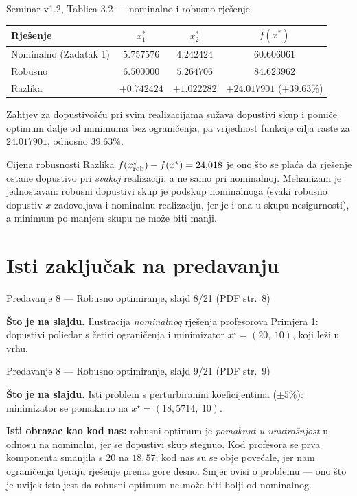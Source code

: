 \begin{seminar}{Seminar v1.2, Tablica 3.2 --- nominalno i robusno rješenje}
\begin{center}
\begin{tabular}{lccc}
\toprule
\textbf{Rješenje} & $x_1^*$ & $x_2^*$ & $f(x^*)$ \\
\midrule
Nominalno (Zadatak 1) & $5.757576$ & $4.242424$ & $60.606061$ \\
Robusno               & $6.500000$ & $5.264706$ & $84.623962$ \\
\midrule
Razlika               & $+0.742424$ & $+1.022282$ & $+24.017901$ ($+39.63\%$) \\
\bottomrule
\end{tabular}
\end{center}

Zahtjev za dopustivošću pri svim realizacijama sužava dopustivi skup i pomiče
optimum dalje od minimuma bez ograničenja, pa vrijednost funkcije cilja raste za
$24.017901$, odnosno $39.63\%$.
\end{seminar}

\begin{pojam}{Cijena robusnosti}
Razlika $f(x_{\mathrm{rob}}^{\star}) - f(x^{\star}) = 24{,}018$ je ono što se plaća
da rješenje ostane dopustivo pri \emph{svakoj} realizaciji, a ne samo pri
nominalnoj. Mehanizam je jednostavan: robusni dopustivi skup je podskup
nominalnoga (svaki robusno dopustiv $x$ zadovoljava i nominalnu realizaciju, jer
je i ona u skupu nesigurnosti), a minimum po manjem skupu ne može biti manji.
\end{pojam}

\section{Isti zaključak na predavanju}
\label{sec:z2-predavanje}

\begin{izvor}{Predavanje 8 --- Robusno optimiranje, slajd 8/21 (PDF str.~8)}

\textbf{Što je na slajdu.} Ilustracija \emph{nominalnog} rješenja profesorova
Primjera 1: dopustivi poliedar s četiri ograničenja i minimizator
$x^{\star} = (20,\ 10)$, koji leži u vrhu.
\end{izvor}

\begin{izvor}{Predavanje 8 --- Robusno optimiranje, slajd 9/21 (PDF str.~9)}

\textbf{Što je na slajdu.} Isti problem s perturbiranim koeficijentima
($\pm 5\%$): minimizator se pomaknuo na $x^{\star} = (18{,}5714,\ 10)$.

\textbf{Isti obrazac kao kod nas:} robusni optimum je \emph{pomaknut u
unutrašnjost} u odnosu na nominalni, jer se dopustivi skup stegnuo. Kod
profesora se prva komponenta smanjila s $20$ na $18{,}57$; kod nas su se obje
povećale, jer nam ograničenja tjeraju rješenje prema gore desno. Smjer ovisi o
problemu --- ono što je uvijek isto jest da robusni optimum ne može biti bolji
od nominalnog.
\end{izvor}

